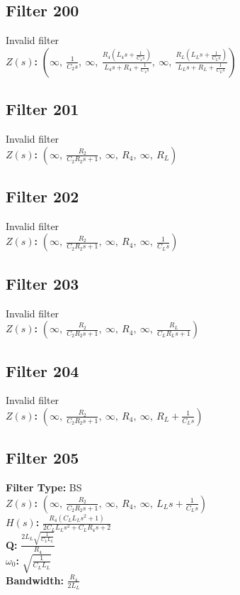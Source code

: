 \documentclass{article}
\begin{document}
\subsection*{Filter 200}
Invalid filter \\ 
\textbf{$Z(s)$:} $\left( \infty, \  \frac{1}{C_{2} s}, \  \infty, \  \frac{R_{4} \left(L_{4} s + \frac{1}{C_{4} s}\right)}{L_{4} s + R_{4} + \frac{1}{C_{4} s}}, \  \infty, \  \frac{R_{L} \left(L_{L} s + \frac{1}{C_{L} s}\right)}{L_{L} s + R_{L} + \frac{1}{C_{L} s}}\right)$ \\ 
\subsection*{Filter 201}
Invalid filter \\ 
\textbf{$Z(s)$:} $\left( \infty, \  \frac{R_{2}}{C_{2} R_{2} s + 1}, \  \infty, \  R_{4}, \  \infty, \  R_{L}\right)$ \\ 
\subsection*{Filter 202}
Invalid filter \\ 
\textbf{$Z(s)$:} $\left( \infty, \  \frac{R_{2}}{C_{2} R_{2} s + 1}, \  \infty, \  R_{4}, \  \infty, \  \frac{1}{C_{L} s}\right)$ \\ 
\subsection*{Filter 203}
Invalid filter \\ 
\textbf{$Z(s)$:} $\left( \infty, \  \frac{R_{2}}{C_{2} R_{2} s + 1}, \  \infty, \  R_{4}, \  \infty, \  \frac{R_{L}}{C_{L} R_{L} s + 1}\right)$ \\ 
\subsection*{Filter 204}
Invalid filter \\ 
\textbf{$Z(s)$:} $\left( \infty, \  \frac{R_{2}}{C_{2} R_{2} s + 1}, \  \infty, \  R_{4}, \  \infty, \  R_{L} + \frac{1}{C_{L} s}\right)$ \\ 
\subsection*{Filter 205}
\textbf{Filter Type:} BS \\ 
\textbf{$Z(s)$:} $\left( \infty, \  \frac{R_{2}}{C_{2} R_{2} s + 1}, \  \infty, \  R_{4}, \  \infty, \  L_{L} s + \frac{1}{C_{L} s}\right)$ \\ 
\textbf{$H(s)$:} $\frac{R_{4} \left(C_{L} L_{L} s^{2} + 1\right)}{2 C_{L} L_{L} s^{2} + C_{L} R_{4} s + 2}$ \\ 
\textbf{Q:} $\frac{2 L_{L} \sqrt{\frac{1}{C_{L} L_{L}}}}{R_{4}}$ \\ 
\textbf{$\omega_0$:} $\sqrt{\frac{1}{C_{L} L_{L}}}$ \\ 
\textbf{Bandwidth:} $\frac{R_{4}}{2 L_{L}}$ \\ 
\end{document}
